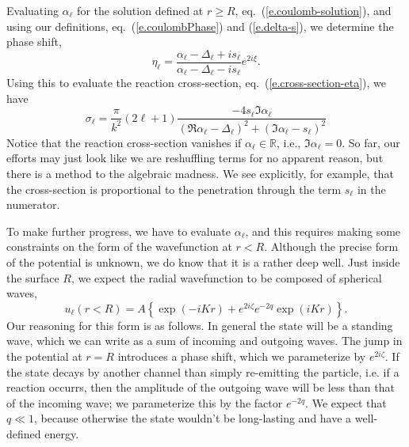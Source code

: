 Evaluating $\alpha_{\ell}$ for the solution defined at $r \geq R$, eq.~(\ref{e.coulomb-solution}), and using our definitions, eq.~(\ref{e.coulombPhase}) and (\ref{e.delta-s}), we determine the phase shift,
\[
\eta_{\ell} = \frac{\alpha_{\ell} - \Delta_{\ell} + is_{\ell} }{\alpha_{\ell} - \Delta_{\ell} -i s_{\ell}}e^{2i\xi}.
\]
Using this to evaluate the reaction cross-section, eq.~(\ref{e.cross-section-eta}), we have
\begin{equation}\label{e.cross-section-alpha}
\sigma_{\ell} = \frac{\pi}{k^{2}}(2\ell +1) \frac{-4s_{\ell}\Im\alpha_{\ell}}{(\Re\alpha_{\ell}-\Delta_{\ell})^{2} + (\Im\alpha_{\ell} - s_{\ell})^{2}}
\end{equation}
Notice that the reaction cross-section vanishes if $\alpha_{\ell}\in\mathbb{R}$, i.e., $\Im\alpha_{\ell}=0$.  So far, our efforts may just look like we are reshuffling terms for no apparent reason, but there is a method to the algebraic madness. We see explicitly, for example, that the cross-section is proportional to the penetration through the term $s_{\ell}$ in the numerator.

To make further progress, we have to evaluate $\alpha_{\ell}$, and this requires making some constraints on the form of the wavefunction at $r < R$. Although the precise form of the potential is unknown, we do know that it is a rather deep well.  Just inside the surface $R$, we expect the radial wavefunction to be composed of spherical waves,
\[
u_{\ell}(r<R) = A\left\{\exp(-iKr) + e^{2i\zeta}e^{-2q}\exp(iKr)\right\}.
\]
Our reasoning for this form is as follows.  In general the state will be a standing wave, which we can write as a sum of incoming and outgoing waves.  The jump in the potential at $r=R$ introduces a phase shift, which we parameterize by $e^{2i\zeta}$. If the state decays by another channel than simply re-emitting the particle, i.e. if a reaction occurrs, then the amplitude of the outgoing wave will be less than that of the incoming wave; we parameterize this by the factor $e^{-2q}$.  We expect that $q\ll 1$, because otherwise the state wouldn't be long-lasting and have a well-defined energy.

